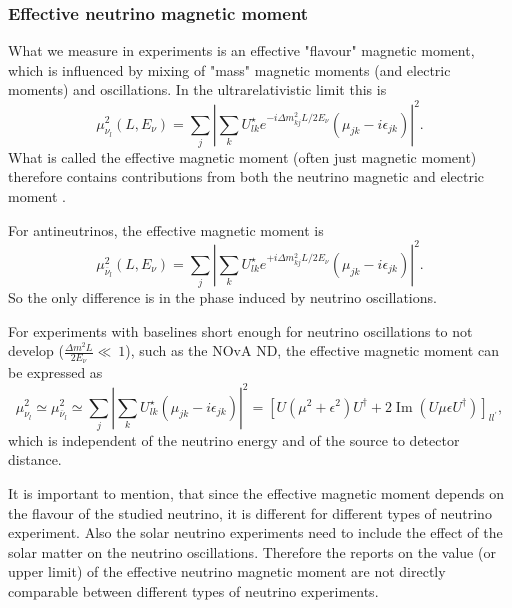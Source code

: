 \subsubsection{Effective neutrino magnetic moment}
What we measure in experiments is an effective "flavour" magnetic moment, which is influenced by mixing of "mass" magnetic moments (and electric moments) and oscillations. In the ultrarelativistic limit this is
\begin{equation}
\mu_{\nu_l}^2\left(L,E_{\nu}\right)=\sum_j\left|\sum_k U^{\star}_{lk}e^{-i\Delta m^2_{kj}L/2E_{\nu}}\left(\mu_{jk}-i\epsilon_{jk}\right)\right|^2.
\end{equation}
What is called the effective magnetic moment (often just magnetic moment) therefore contains contributions from both the neutrino magnetic and electric moment \cite{nuElmagInt2015.pdf}.

For antineutrinos, the effective magnetic moment is
\begin{equation}
\mu_{\overline{\nu}_l}^2\left(L,E_{\nu}\right)=\sum_j\left|\sum_k U^{\star}_{lk}e^{+i\Delta m^2_{kj}L/2E_{\nu}}\left(\mu_{jk}-i\epsilon_{jk}\right)\right|^2.
\end{equation}
So the only difference is in the phase induced by neutrino oscillations.

For experiments with baselines short enough for neutrino oscillations to not develop ($\frac{\Delta m^2L}{2E_{\nu}}\ll~1$), such as the NOvA ND, the effective magnetic moment can be expressed as
\begin{equation}
\mu_{\nu_l}^2\simeq\mu_{\overline{\nu}_l}^2\simeq\sum_j\left|\sum_k U_{lk}^{\star}\left(\mu_{jk}-i\epsilon_{jk}\right)\right|^2=\left[U\left(\mu^2+\epsilon^2\right)U^{\dagger}+2\operatorname{Im}\left(U\mu\epsilon U^{\dagger}\right)\right]_{ll^{\prime}},
\end{equation}
which is independent of the neutrino energy and of the source to detector distance.

It is important to mention, that since the effective magnetic moment depends on the flavour of the studied neutrino, it is different for different types of neutrino experiment. Also the solar neutrino experiments need to include the effect of the solar matter on the neutrino oscillations. Therefore the reports on the value (or upper limit) of the effective neutrino magnetic moment are not directly comparable between different types of neutrino experiments.

